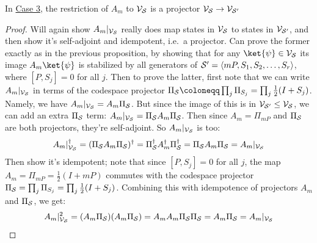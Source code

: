 \begin{proposition}
    In \hyperref[thm:stabilizer_group_update_measurement:case3]{Case 3}, the restriction of $A_m$ to $\mathcal{V}_{\mathcal{S}}$ is a projector $\mathcal{V}_{\mathcal{S}} \to \mathcal{V}_{\mathcal{S}'}$
    \begin{proof}
        Will again show $A_m|_{\mathcal{V}_{\mathcal{S}}}$ really does map states in $\mathcal{V}_{\mathcal{S}}$ to states in $\mathcal{V}_{\mathcal{S}'}$, and then show it's self-adjoint and idempotent, i.e.\ a projector.
        Can prove the former exactly as in the previous proposition, by showing that for any $\ket{\psi} \in \VVV_\SSS$ its image $A_m\ket{\psi}$ is stabilized by all generators of $\mathcal{S}' = \langle mP, S_1, S_2, \ldots, S_r \rangle$, where $[P, S_j] = 0$ for all $j$.
        Then to prove the latter, first note that we can write $A_m|_{\mathcal{V}_{\mathcal{S}}}$ in terms of the codespace projector $\Pi_\SSS \coloneqq \prod_{j} \Pi_{S_j} = \prod_{j} \frac{1}{2}(I + S_j)$.
        Namely, we have $A_m|_{\mathcal{V}_{\mathcal{S}}} = A_m \Pi_{\mathcal{S}}$.
        But since the image of this is in $\mathcal{V}_{\mathcal{S}'} \leq \mathcal{V}_{\mathcal{S}}$, we can add an extra $\Pi_{\mathcal{S}}$ term: $A_m|_{\mathcal{V}_{\mathcal{S}}} = \Pi_{\mathcal{S}} A_m \Pi_{\mathcal{S}}$.
        Then since $A_m = \Pi_{mP}$ and $\Pi_{\mathcal{S}}$ are both projectors, they're self-adjoint.
        So $A_m|_{\mathcal{V}_{\mathcal{S}}}$ is too:
        \begin{equation}\label{eq:A_m_restriction_self_adjoint}
            A_m|_{\mathcal{V}_{\mathcal{S}}}^\dagger
            = (\Pi_{\mathcal{S}} A_m \Pi_{\mathcal{S}})^\dagger
            = \Pi_{\mathcal{S}}^\dagger A_m^\dagger \Pi_{\mathcal{S}}^\dagger
            = \Pi_{\mathcal{S}} A_m \Pi_{\mathcal{S}}
            = A_m|_{\mathcal{V}_{\mathcal{S}}}
        \end{equation}
        Then show it's idempotent; note that since $[P, S_j] = 0$ for all $j$, the map $A_m = \Pi_{mP} = \frac{1}{2}(I + mP)$ commutes with the codespace projector $\Pi_{\mathcal{S}} = \prod_{j} \Pi_{S_j} = \prod_{j} \frac{1}{2}(I + S_j)$.
        Combining this with idempotence of projectors $A_m$ and $\Pi_{\mathcal{S}}$, we get:
        \begin{equation}\label{eq:A_m_restriction_idempotent}
            A_m|_{\mathcal{V}_{\mathcal{S}}}^2
            = (A_m \Pi_{\mathcal{S}})(A_m \Pi_{\mathcal{S}})
            = A_m A_m \Pi_{\mathcal{S}} \Pi_{\mathcal{S}}
            = A_m \Pi_{\mathcal{S}}
            = A_m|_{\mathcal{V}_{\mathcal{S}}}
        \end{equation}
    \end{proof}
\end{proposition}


